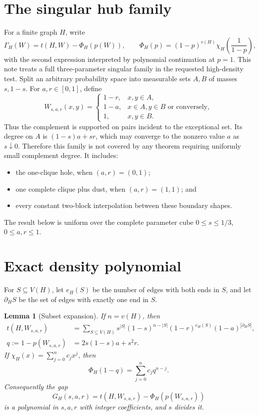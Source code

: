 \documentclass[11pt]{article}
\newtheorem{lemma}[theorem]{Lemma}
\begin{document}
\section{The singular hub family}

For a finite graph $H$, write
\[
 \Gamma_H(W)=t(H,W)-\Phi_H(p(W)),
 \qquad
 \Phi_H(p)=(1-p)^{v(H)}
 \chi_H\!\left(\frac1{1-p}\right),
\]
with the second expression interpreted by polynomial continuation at $p=1$.
This note treats a full three-parameter singular family in the requested
high-density test.  Split an arbitrary probability space into measurable
sets $A,B$ of masses $s,1-s$.  For $a,r\in[0,1]$, define
\begin{equation}
 W_{s,a,r}(x,y)=
 \begin{cases}
  1-r,&x,y\in A,\\
  1-a,&x\in A, y\in B\text{ or conversely},\\
  1,&x,y\in B.
 \end{cases}
 \label{eq:hub-family}
\end{equation}
Thus the complement is supported on pairs incident to the exceptional set.
Its degree on $A$ is $(1-s)a+sr$, which may converge to the nonzero value
$a$ as $s\downarrow0$.  Therefore this family is not covered by any theorem
requiring uniformly small complement degree.  It includes:
\begin{itemize}
 \item the one-clique hole, when $(a,r)=(0,1)$;
 \item one complete clique plus dust, when $(a,r)=(1,1)$; and
 \item every constant two-block interpolation between these boundary shapes.
\end{itemize}
The result below is uniform over the complete parameter cube
$0\leq s\leq1/3$, $0\leq a,r\leq1$.


\section{Exact density polynomial}

For $S\subseteq V(H)$, let $e_H(S)$ be the number of edges with both ends in
$S$, and let $\partial_HS$ be the set of edges with exactly one end in $S$.

\begin{lemma}[Subset expansion]
\label{lem:subset}
If $n=v(H)$, then
\begin{align}
 t(H,W_{s,a,r})
 &=\sum_{S\subseteq V(H)}
 s^{|S|}(1-s)^{n-|S|}
 (1-r)^{e_H(S)}(1-a)^{|\partial_HS|},
 \label{eq:hom-density}\\
 q:=1-p(W_{s,a,r})
 &=2s(1-s)a+s^2r.
 \label{eq:complement-density}
\end{align}
If $\chi_H(x)=\sum_{j=0}^nc_jx^j$, then
\begin{equation}
 \Phi_H(1-q)=\sum_{j=0}^nc_jq^{n-j}.
 \label{eq:target-polynomial}
\end{equation}
Consequently the gap
\begin{equation}
 G_H(s,a,r)=t(H,W_{s,a,r})-\Phi_H(p(W_{s,a,r}))
 \label{eq:gap}
\end{equation}
is a polynomial in $s,a,r$ with integer coefficients, and $s$ divides it.
\end{lemma}
\end{document}
